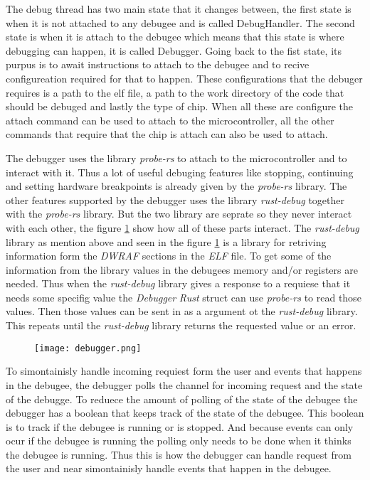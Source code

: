 
The debug thread has two main state that it changes between, the first state is when it is not attached to any debugee and is called DebugHandler.
The second state is when it is attach to the debugee which means that this state is where debugging can happen, it is called Debugger.
Going back to the fist state, its purpus is to await instructions to attach to the debugee and to recive configureation required for that to happen.
These configurations that the debuger requires is a path to the elf file, a path to the work directory of the code that should be debuged and lastly the type of chip.
When all these are configure the attach command can be used to attach to the microcontroller, all the other commands that require that the chip is attach can also be used to attach.


The debugger uses the library \emph{probe-rs} \cite{probe} to attach to the microcontroller and to interact with it.
Thus a lot of useful debuging features like stopping, continuing and setting hardware breakpoints is already given by the \emph{probe-rs} library.
The other features supported by the debugger uses the library \emph{rust-debug} together with the \emph{probe-rs} library.
But the two library are seprate so they never interact with each other, the figure \ref{fig:debugger} show how all of these parts interact.
The \emph{rust-debug} library as mention above and seen in the figure \ref{fig:debugger} is a library for retriving information form the \emph{DWRAF} sections in the \emph{ELF} file.
To get some of the information from the library values in the debugees memory and/or registers are needed.
Thus when the \emph{rust-debug} library gives a response to a requiese that it needs some specifig value the \emph{Debugger} \emph{Rust} struct can use \emph{probe-rs} to read those values.
Then those values can be sent in as a argument ot the \emph{rust-debug} library.
This repeats until the \emph{rust-debug} library returns the requested value or an error.


\begin{figure}[h]
    \centering
    \texttt{[image: debugger.png]}
    \label{fig:debugger}
\end{figure}


To simontainisly handle incoming requiest form the user and events that happens in the debugee, the debugger polls the channel for incoming request and the state of the debugge.
To reduece the amount of polling of the state of the debugee the debugger has a boolean that keeps track of the state of the debugee.
This boolean is to track if the debugee is running or is stopped.
And because events can only ocur if the debugee is running the polling only needs to be done when it thinks the debugee is running.
Thus this is how the debugger can handle request from the user and near simontainisly handle events that happen in the debugee.



